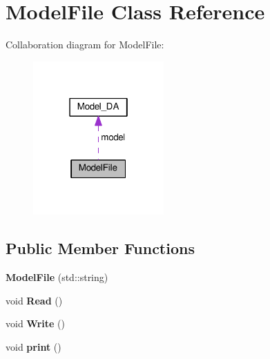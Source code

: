 \section{Model\+File Class Reference}
\label{class_model_file}


Collaboration diagram for Model\+File\+:\nopagebreak
\begin{figure}[H]
\begin{center}
\leavevmode
\includegraphics[width=142pt]{class_model_file__coll__graph}
\end{center}
\end{figure}
\subsection*{Public Member Functions}
\begin{DoxyCompactItemize}
\item 
{\bfseries Model\+File} (std\+::string)\label{class_model_file_a1f91afe90336389d5f520231abb48d1a}

\item 
void {\bfseries Read} ()\label{class_model_file_a0da7455c9ed7ad365f1afc9429d2884d}

\item 
void {\bfseries Write} ()\label{class_model_file_aefcbc0cf6c5244cc9b9491b50dc7bcbb}

\item 
void {\bfseries print} ()\label{class_model_file_ad261c3a6cb147743bbfcb24209fd3585}

\end{DoxyCompactItemize}
